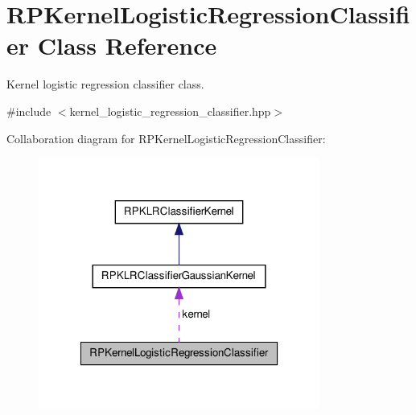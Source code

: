 \hypertarget{class_r_p_kernel_logistic_regression_classifier}{\section{\-R\-P\-Kernel\-Logistic\-Regression\-Classifier \-Class \-Reference}
\label{class_r_p_kernel_logistic_regression_classifier}
}


\-Kernel logistic regression classifier class.  




{\ttfamily \#include $<$kernel\-\_\-logistic\-\_\-regression\-\_\-classifier.\-hpp$>$}



\-Collaboration diagram for \-R\-P\-Kernel\-Logistic\-Regression\-Classifier\-:\nopagebreak
\begin{figure}[H]
\begin{center}
\leavevmode
\includegraphics[width=262pt]{class_r_p_kernel_logistic_regression_classifier__coll__graph}
\end{center}
\end{figure}

